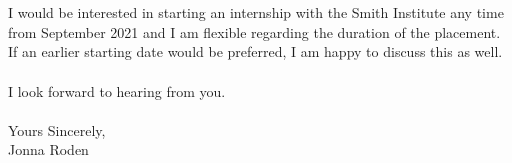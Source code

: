 \documentclass[11pt, letterpaper]{article}
\begin{document}
\\
\\
\noindent
I would be interested in starting an internship with the Smith Institute any time from September 2021 and I am flexible regarding the duration of the placement. If an earlier starting date would be preferred, I am happy to discuss this as well.
\\
\\
\noindent
I look forward to hearing from you.\\
\\
\noindent
Yours Sincerely,\\
Jonna Roden

 	
	
	
	
	
	
	
\end{document}
